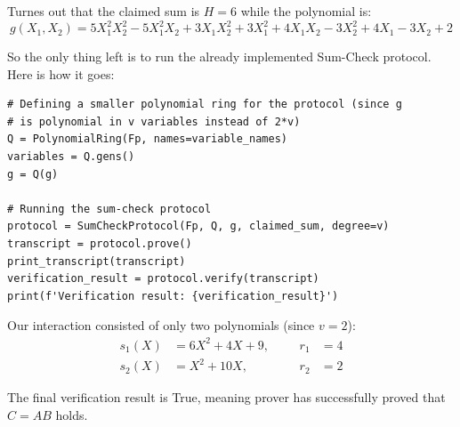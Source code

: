 \documentclass[../../book.tex]{subfiles}
\begin{document}
Turnes out that the claimed sum is $H=6$ while the polynomial is:
\begin{equation*}
    g(X_1,X_2) = 5X_1^2X_2^2 - 5X_1^2X_2 + 3X_1X_2^2 + 3X_1^2 + 4X_1X_2 - 3X_2^2 + 4X_1 - 3X_2 + 2
\end{equation*}

So the only thing left is to run the already implemented Sum-Check protocol.
Here is how it goes:
\begin{verbatim}
# Defining a smaller polynomial ring for the protocol (since g 
# is polynomial in v variables instead of 2*v)
Q = PolynomialRing(Fp, names=variable_names)
variables = Q.gens()
g = Q(g)

# Running the sum-check protocol
protocol = SumCheckProtocol(Fp, Q, g, claimed_sum, degree=v)
transcript = protocol.prove()
print_transcript(transcript)
verification_result = protocol.verify(transcript)
print(f'Verification result: {verification_result}')
\end{verbatim}

Our interaction consisted of only two polynomials (since $v=2$):
\begin{align*}
    s_1(X) &= 6X^2 + 4X + 9, &&& r_1 &= 4 \\
    s_2(X) &= X^2 + 10X, &&& r_2 &= 2
\end{align*}

The final verification result is \textsf{True}, meaning prover has successfully
proved that $C = AB$ holds. 
\end{document}
